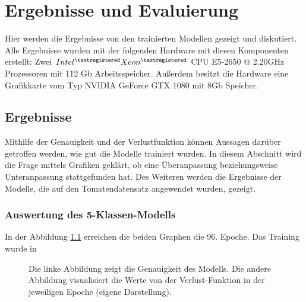 \chapter{Ergebnisse und Evaluierung}
\label{chapter:evaluation}

Hier werden die Ergebnisse von den trainierten Modellen gezeigt und diskutiert. Alle Ergebnisse wurden mit der folgenden Hardware mit diesen Komponenten erstellt: Zwei $Intel^{\textregistered} Xeon^{\textregistered}$ CPU E5-2650 @ 2.20GHz Prozessoren mit 112 Gb Arbeitsspeicher. Außerdem besitzt die Hardware eine Grafikkarte vom Typ NVIDIA GeForce GTX 1080 mit 8Gb Speicher.



\section{Ergebnisse}

Mithilfe der Genauigkeit und der Verlustfunktion können Aussagen darüber getroffen werden, wie gut die Modelle trainiert wurden. In diesem Abschnitt wird die Frage mittels Grafiken geklärt, ob eine Überanpassung beziehungsweise Unteranpassung stattgefunden hat. Des Weiteren werden die Ergebnisse der Modelle, die auf den Tomatendatensatz angewendet wurden, gezeigt.

\subsection{Auswertung des 5-Klassen-Modells}

In der Abbildung \ref{eval_acc_loss_5} erreichen die beiden Graphen die 96. Epoche. Das Training wurde in 

\begin{figure}[h!]
	
	\hfill
	\hfill
	\hfill
	\caption{Die linke Abbildung zeigt die Genauigkeit des Modells. Die andere Abbildung visualisiert die Werte von der Verlust-Funktion in der jeweiligen Epoche (eigene Darstellung).
	}
	\label{eval_acc_loss_5}
\end{figure}

